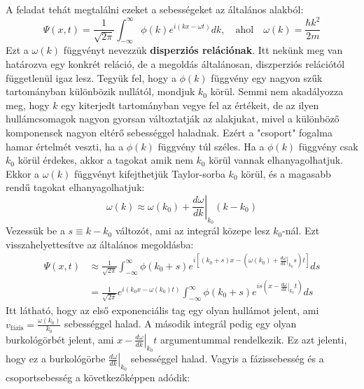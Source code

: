 \documentclass[../main.tex]{subfiles}
\begin{document}
A feladat tehát megtalálni ezeket a sebességeket az általános alakból:
\begin{equation}
    \Psi(x,t) = \frac{1}{\sqrt{2 \pi}} \int_{-\infty}^{\infty} \phi(k) e^{i (kx - \omega t)} dk, \quad \text{ahol} \quad \omega(k) = \frac{\hbar k^2}{2m}
\end{equation}
Ezt a $\omega(k)$ függvényt nevezzük \textbf{disperziós relációnak}. Itt nekünk meg van határozva egy konkrét reláció, de a megoldás általánosan, diszperziós relációtól függetlenül igaz lesz.
Tegyük fel, hogy a $\phi(k)$ függvény egy nagyon szűk tartományban különbözik nullától, mondjuk $k_0$ körül. Semmi nem akadályozza meg, hogy $k$ egy kiterjedt tartományban vegye fel az értékeit,
de az ilyen hullámcsomagok nagyon gyorsan változtatják az alakjukat, mivel a különböző komponensek nagyon eltérő sebességgel haladnak. Ezért a "csoport" fogalma hamar értelmét veszti, ha a $\phi(k)$ függvény túl széles.
Ha a $\phi(k)$ függvény csak $k_0$ körül érdekes, akkor a tagokat amik nem $k_0$ körül vannak elhanyagolhatjuk. Ekkor a $\omega(k)$ függvényt kifejthetjük Taylor-sorba $k_0$ körül, és a magasabb rendű tagokat elhanyagolhatjuk:
\begin{equation}
    \omega(k) \approx \omega(k_0) + \left. \frac{d \omega}{d k} \right|_{k_0} (k - k_0)
\end{equation}
Vezessük be a $s \equiv k - k_0$ változót, ami az integrál közepe lesz $k_0$-nál. Ezt visszahelyettesítve az általános megoldásba:
\begin{equation}
    \begin{aligned}
        \Psi(x,t) &\approx \frac{1}{\sqrt{2 \pi}} \int_{-\infty}^{\infty} \phi(k_0 + s) e^{i \left[ (k_0 + s)x - \left( \omega(k_0) + \left. \frac{d \omega}{d k} \right|_{k_0} s \right) t \right]} ds \\
        &= \frac{1}{\sqrt{2 \pi}} e^{i (k_0 x - \omega(k_0) t)} \int_{-\infty}^{\infty} \phi(k_0 + s) e^{i s \left( x - \left. \frac{d \omega}{d k} \right|_{k_0} t \right)} ds
    \end{aligned}
\end{equation}
Itt látható, hogy az első exponenciális tag egy olyan hullámot jelent, ami $v_{\text{fázis}} = \frac{\omega(k_0)}{k_0}$ sebességgel halad. A második integrál pedig egy olyan burkológörbét jelent, ami
$x - \left. \frac{d \omega}{d k} \right|_{k_0} t$ argumentummal rendelkezik. Ez azt jelenti, hogy ez a burkológörbe $\left. \frac{d \omega}{d k} \right|_{k_0}$ sebességgel halad. Vagyis a fázissebesség és a csoportsebesség a következőképpen adódik:
\end{document}
